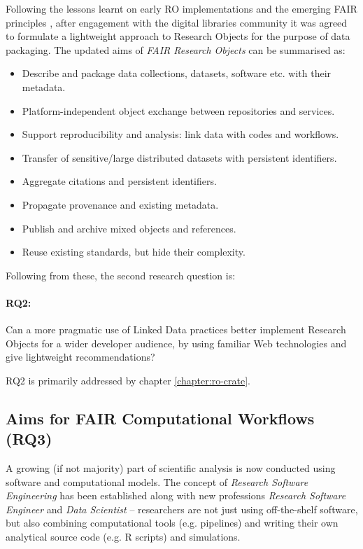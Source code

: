 Following the lessons learnt on early RO implementations and the emerging FAIR principles \cite{Wilkinson 2016,Jacobsen 2020}, after engagement with the digital libraries community it was agreed to formulate a lightweight approach to Research Objects \cite{Sefton 2018,Ó Carragáin 2019b} for the purpose of data packaging. The updated aims of \emph{FAIR Research Objects} can be summarised as:
 
\begin{itemize}
    \item Describe and package data collections, datasets, software etc. with their metadata.
    \item Platform-independent object exchange between repositories and services.
    \item Support reproducibility and analysis: link data with codes and workflows.
    \item Transfer of sensitive/large distributed datasets with persistent identifiers.
    \item Aggregate citations and persistent identifiers.
    \item Propagate provenance and existing metadata.
    \item Publish and archive mixed objects and references.
    \item Reuse existing standards, but hide their complexity.
\end{itemize}

Following from these, the second research question is: 

\paragraph{RQ2:}\label{rq2}  Can a more pragmatic use of Linked Data practices better implement Research Objects for a wider developer audience, by using familiar Web technologies and give lightweight recommendations?

RQ2 is primarily addressed by chapter \ref{chapter:ro-crate}.


\subsection{Aims for FAIR Computational Workflows (RQ3)}
\label{intro:rq3}

A growing (if not majority) part of scientific analysis is now conducted using software and computational models. The concept of \emph{Research Software Engineering} \cite{Cohen 2020} has been established along with new professions \emph{Research Software Engineer} \cite{Baxter 2012} and \emph{Data Scientist} \cite{van der Aalst 2014} -- researchers are not just using off-the-shelf software, but also combining computational tools (e.g. pipelines) and writing their own analytical source code (e.g. R scripts) and simulations.

